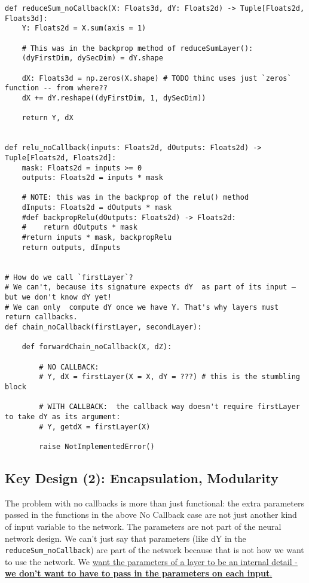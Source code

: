 \documentclass[
]{article}
\begin{document}
\begin{verbatim}
def reduceSum_noCallback(X: Floats3d, dY: Floats2d) -> Tuple[Floats2d, Floats3d]:
    Y: Floats2d = X.sum(axis = 1)

    # This was in the backprop method of reduceSumLayer():
    (dyFirstDim, dySecDim) = dY.shape

    dX: Floats3d = np.zeros(X.shape) # TODO thinc uses just `zeros` function -- from where??
    dX += dY.reshape((dyFirstDim, 1, dySecDim))

    return Y, dX


def relu_noCallback(inputs: Floats2d, dOutputs: Floats2d) -> Tuple[Floats2d, Floats2d]:
    mask: Floats2d = inputs >= 0
    outputs: Floats2d = inputs * mask

    # NOTE: this was in the backprop of the relu() method
    dInputs: Floats2d = dOutputs * mask
    #def backpropRelu(dOutputs: Floats2d) -> Floats2d:
    #    return dOutputs * mask
    #return inputs * mask, backpropRelu
    return outputs, dInputs


# How do we call `firstLayer`?
# We can't, because its signature expects dY  as part of its input – but we don't know dY yet!
# We can only  compute dY once we have Y. That's why layers must return callbacks.
def chain_noCallback(firstLayer, secondLayer):

    def forwardChain_noCallback(X, dZ):

        # NO CALLBACK:
        # Y, dX = firstLayer(X = X, dY = ???) # this is the stumbling block

        # WITH CALLBACK:  the callback way doesn't require firstLayer to take dY as its argument:
        # Y, getdX = firstLayer(X)

        raise NotImplementedError()
\end{verbatim}

\hypertarget{key-design-2-encapsulation-modularity}{%
\subsection{Key Design (2): Encapsulation,
Modularity}\label{key-design-2-encapsulation-modularity}}

The problem with no callbacks is more than just functional: the extra
parameters passed in the functions in the above No Callback case are not
just another kind of input variable to the network. The parameters are
not part of the neural network design. We can't just say that parameters
(like dY in the \texttt{reduceSum_noCallback}) are part of
the network because that is not how we want to use the network. We
\href{https://hyp.is/HQ2zhE53EeqE19foO7IuTQ/thinc.ai/docs/concept}{want
the parameters of a layer to be an internal detail - \textbf{we don't
want to have to pass in the parameters on each input}.}
\end{document}
